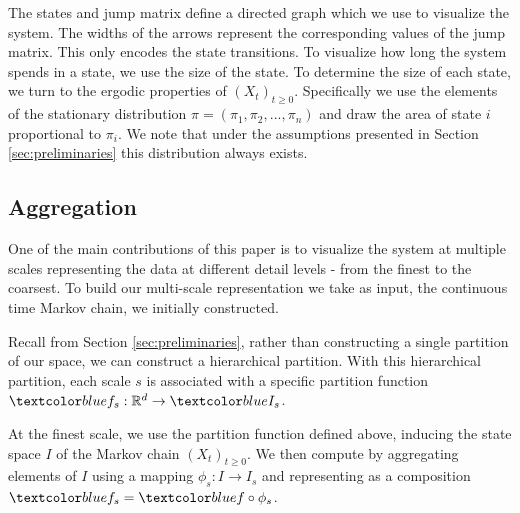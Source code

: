 The states and jump matrix define a directed graph which we use to visualize the system. The widths of the arrows represent the corresponding values of the jump matrix. This only encodes the state transitions. To visualize how long the system spends in a state, we use the size of the state.
To determine the size of each state, we turn to the ergodic properties of $(X_t)_{t \ge 0}$. Specifically
we use the elements of the stationary distribution $\pi = (\pi_1, \pi_2, ..., \pi_n)$ and draw the area of
state $i$ proportional to $\pi_i$. We note that under the assumptions presented in Section \ref{sec:preliminaries}
this distribution always exists.  


\subsection{Aggregation}
\label{sec:framework-aggregation}

One of the main contributions of this paper is to visualize the system at multiple scales  representing
the data at different detail levels - from the finest to the coarsest. To build our multi-scale representation we take as input, the continuous time Markov chain, we initially constructed. 

Recall from Section \ref{sec:preliminaries}, rather than constructing a single partition of our space, we can construct a hierarchical partition. With this hierarchical partition,  each scale $s$ is associated with a specific partition
function $\lstopar{f_s}: \mathbb{R}^d \rightarrow \lstopar{I_s}$.

At the finest scale, we use the partition function  defined above, inducing the state space $I$ of the Markov chain $(X_t)_{t \ge 0}$. 
We then compute  by aggregating elements of $I$ using a mapping $\phi_s: I \rightarrow I_s$ and representing  as a composition $\lstopar{f_s} = \lstopar{f} \circ \phi_s$.



